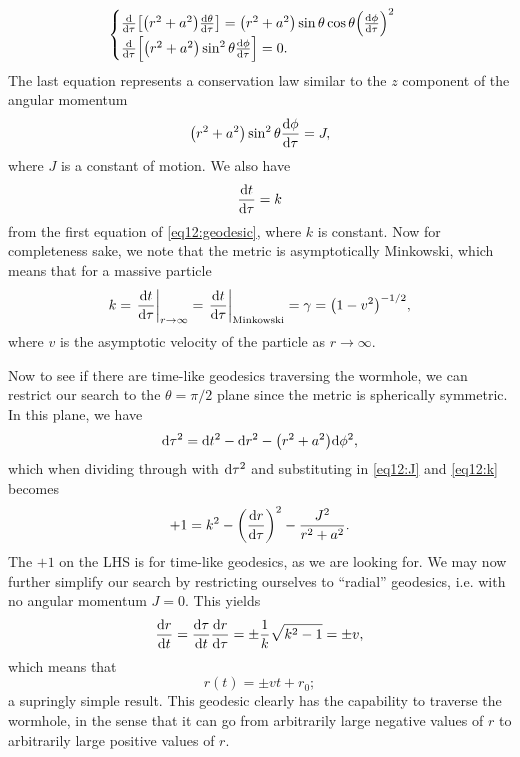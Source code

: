 \documentclass[11pt,a4paper, 
swedish, english %
]{article}
\begin{document}
\begin{equation}
\begin{cases}
\dv{\tau}\qty[\qty(r^2+a^2)\dv{\theta}{\tau}]
=\qty(r^2+a^2)\sin\theta\cos\theta\qty(\dv{\phi}{\tau})^2\\[0.5ex]
\dv{\tau}\qty[\qty(r^2+a^2)\sin^2\theta\dv{\phi}{\tau}]=0.
\end{cases}
\end{equation}
The last equation represents a conservation law similar to the $z$
component of the angular momentum
\begin{equation}\label{eq12:J}
\qty(r^2+a^2)\sin^2\theta\dv{\phi}{\tau}=J,
\end{equation}
where $J$ is a constant of motion. We also have
\begin{equation}\label{eq12:k}
\dv{t}{\tau}=k
\end{equation}
from the first equation of \eqref{eq12:geodesic}, where $k$ is
constant. Now for completeness sake, we note that the metric is
asymptotically Minkowski, which means that for a massive particle
\begin{equation}
k=\eval{\dv{t}{\tau}}_{r\to\infty}=
\eval{\dv{t}{\tau}}_{\text{Minkowski}}=\gamma=\qty(1-v^2)^{-1/2},
\end{equation}
where $v$ is the asymptotic velocity of the particle as $r\to\infty$.

Now to see if there are time-like geodesics traversing the wormhole,
we can restrict our search to the $\theta=\pi/2$ plane since the
metric is spherically symmetric\footnotemark{}. In this plane, we have
\begin{equation}
\mathrm{d}\tau^2=\mathrm{d}{t}^2-\mathrm{d}{r}^2-\qty(r^2+a^2)\mathrm{d}{\phi}^2,
\end{equation}
which when dividing through with $\mathrm{d}\tau^2$ and substituting in
\eqref{eq12:J} and \eqref{eq12:k} becomes
\begin{equation}
+1=k^{2}-\qty(\dv{r}{\tau})^2-\frac{J^2}{r^2+a^2}.
\end{equation}
The $+1$ on the LHS is for time-like geodesics, as we are looking
for. We may now further simplify our search by restricting ourselves
to ``radial'' geodesics, i.e. with no angular momentum $J=0$. This
yields
\begin{equation}
\dv{r}{t}=\dv{\tau}{t}\dv{r}{\tau}=\pm\frac{1}{k}\sqrt{k^2-1}
=\pm v,
\end{equation}
which means that
\begin{equation}
r(t)=\pm vt+r_0;
\end{equation}
a supringly simple result.
This geodesic clearly has the capability to traverse the wormhole, in
the sense that it can go from arbitrarily large negative values of $r$
to arbitrarily large positive values of $r$. 
\end{document}
